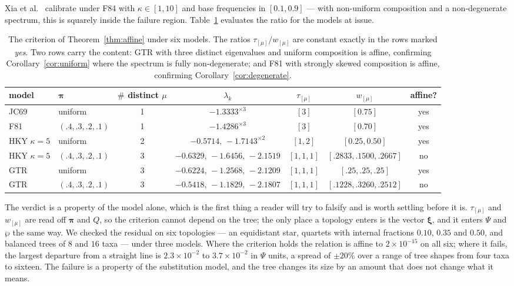 \documentclass[preprint,12pt,authoryear]{elsarticle}
\newcommand{\bpi}{\boldsymbol{\pi}}
\newcommand{\bxi}{\boldsymbol{\xi}}
\theoremstyle{definition}
\theoremstyle{remark}
\begin{document}
Xia et al.~\citep{xia2003iss} calibrate under F84 with
$\kappa\in[1,10]$ and base frequencies in $[0.1,0.9]$ --- with non-uniform
composition and a non-degenerate spectrum, this is squarely inside the failure
region. Table~\ref{tab:criterion} evaluates the ratio for the models at issue.

\begin{table}[t]
\centering
\small
\setlength{\tabcolsep}{4pt}
\footnotesize
\begin{tabular}{llccccc}
\toprule
model & $\bpi$ & $\#$ distinct $\mu$ & $\lambda_k$
      & $\tau_{[\mu]}$ & $w_{[\mu]}$ & affine? \\
\midrule
JC69            & uniform          & 1 & $-1.3333^{\times3}$ & $[3]$ & $[0.75]$ & yes \\
F81             & $(.4,.3,.2,.1)$  & 1 & $-1.4286^{\times3}$ & $[3]$ & $[0.70]$ & yes \\
HKY $\kappa{=}5$& uniform          & 2 & $-0.5714,\,-1.7143^{\times2}$ & $[1,2]$ & $[0.25,0.50]$ & yes \\
HKY $\kappa{=}5$& $(.4,.3,.2,.1)$  & 3 & $-0.6329,\,-1.6456,\,-2.1519$ & $[1,1,1]$ & $[.2833,.1500,.2667]$ & no \\
GTR             & uniform          & 3 & $-0.6224,\,-1.2568,\,-2.1209$ & $[1,1,1]$ & $[.25,.25,.25]$ & yes \\
GTR             & $(.4,.3,.2,.1)$  & 3 & $-0.5418,\,-1.1829,\,-2.1807$ & $[1,1,1]$ & $[.1228,.3260,.2512]$ & no \\
\bottomrule
\end{tabular}
\caption{The criterion of Theorem~\ref{thm:affine} under six models. The
ratios $\tau_{[\mu]}/w_{[\mu]}$ are constant exactly in the rows marked
\emph{yes}. Two rows carry the content: GTR with three distinct eigenvalues
and uniform composition is affine, confirming
Corollary~\ref{cor:uniform} where the spectrum is fully non-degenerate; and
F81 with strongly skewed composition is affine, confirming
Corollary~\ref{cor:degenerate}.}
\label{tab:criterion}
\end{table}

The verdict is a property of the model alone, which is the first thing a
reader will try to falsify and is worth settling before it is. $\tau_{[\mu]}$
and $w_{[\mu]}$ are read off $\bpi$ and $Q$, so the criterion cannot depend on
the tree; the only place a topology enters is the vector $\bxi$, and it enters
$\Psi$ and $\wp$ the same way. We checked the residual on six topologies ---
an equidistant star, quartets with internal fractions $0.10$, $0.35$ and
$0.50$, and balanced trees of $8$ and $16$ taxa --- under three models. Where
the criterion holds the relation is affine to $2\times10^{-15}$ on all six;
where it fails, the largest departure from a straight line is
$2.3\times10^{-2}$ to $3.7\times10^{-2}$ in $\Psi$ units, a spread of
$\pm20\%$ over a range of tree shapes from four taxa to sixteen. The failure
is a property of the substitution model, and the tree changes its size by an
amount that does not change what it means.
\end{document}
